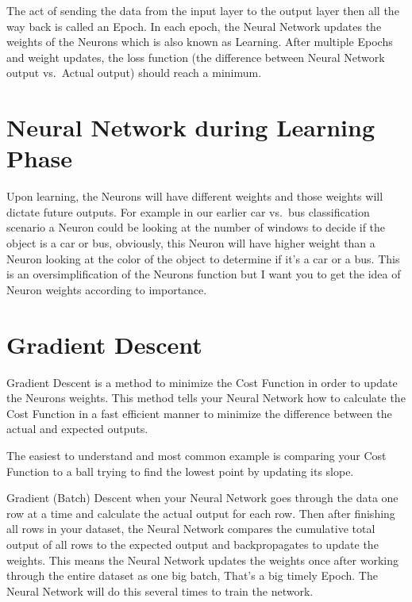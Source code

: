 \documentclass[
]{book}
\begin{document}
The act of sending the data from the input layer to the output layer then all the way back is called an Epoch. In each epoch, the Neural Network updates the weights of the Neurons which is also known as Learning. After multiple Epochs and weight updates, the loss function (the difference between Neural Network output vs.~Actual output) should reach a minimum.

\hypertarget{neural-network-during-learning-phase}{%
\section{Neural Network during Learning Phase}\label{neural-network-during-learning-phase}}

Upon learning, the Neurons will have different weights and those weights will dictate future outputs. For example in our earlier car vs.~bus classification scenario a Neuron could be looking at the number of windows to decide if the object is a car or bus, obviously, this Neuron will have higher weight than a Neuron looking at the color of the object to determine if it's a car or a bus. This is an oversimplification of the Neurons function but I want you to get the idea of Neuron weights according to importance.

\hypertarget{gradient-descent-1}{%
\section{Gradient Descent}\label{gradient-descent-1}}

Gradient Descent is a method to minimize the Cost Function in order to update the Neurons weights. This method tells your Neural Network how to calculate the Cost Function in a fast efficient manner to minimize the difference between the actual and expected outputs.

The easiest to understand and most common example is comparing your Cost Function to a ball trying to find the lowest point by updating its slope.

Gradient (Batch) Descent when your Neural Network goes through the data one row at a time and calculate the actual output for each row. Then after finishing all rows in your dataset, the Neural Network compares the cumulative total output of all rows to the expected output and backpropagates to update the weights. This means the Neural Network updates the weights once after working through the entire dataset as one big batch, That's a big timely Epoch. The Neural Network will do this several times to train the network.
\end{document}
